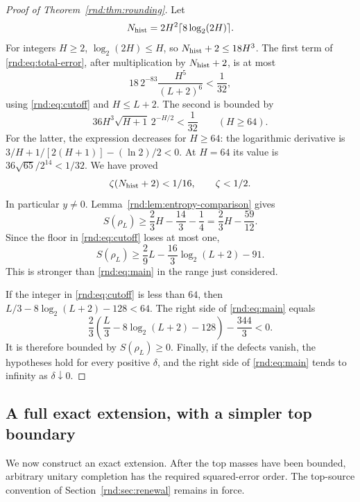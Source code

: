 \begin{proof}[Proof of Theorem~\ref{rnd:thm:rounding}]
Let
\[
 N_{\rm hist}=2H^2\lceil8\log_2(2H)\rceil.
\]
For integers $H\ge2$, $\log_2(2H)\le H$, so
$N_{\rm hist}+2\le18H^3$.
The first term of \eqref{rnd:eq:total-error}, after multiplication by $N_{\rm hist}+2$, is at most
\[
 18\,2^{-83}\frac{H^5}{(L+2)^6}<\frac1{32},
\]
using \eqref{rnd:eq:cutoff} and $H\le L+2$. The second is bounded by
\[
 36H^3\sqrt{H+1}\,2^{-H/2}<\frac1{32}\qquad(H\ge64).
\]
For the latter, the expression decreases for $H\ge64$: the logarithmic derivative is
$3/H+1/[2(H+1)]-(\ln2)/2<0$. At $H=64$ its value is
$36\sqrt{65}/2^{14}<1/32$. We have proved
\[
 \zeta(N_{\rm hist}+2)<1/16,\qquad \zeta<1/2.
\]
In particular $y\ne0$. Lemma~\ref{rnd:lem:entropy-comparison} gives
\[
 S(\rho_L)\ge\frac23H-\frac{14}{3}-\frac14
 =\frac23H-\frac{59}{12}.
\]
Since the floor in \eqref{rnd:eq:cutoff} loses at most one,
\[
 S(\rho_L)\ge\frac29L-\frac{16}{3}\log_2(L+2)-91.
\]
This is stronger than \eqref{rnd:eq:main} in the range just considered.

If the integer in \eqref{rnd:eq:cutoff} is less than $64$, then
$L/3-8\log_2(L+2)-128<64$. The right side of \eqref{rnd:eq:main} equals
\[
 \frac23\left(\frac L3-8\log_2(L+2)-128\right)-\frac{344}{3}<0.
\]
It is therefore bounded by $S(\rho_L)\ge0$. Finally, if the defects vanish, the hypotheses hold for every positive $\delta$, and the right side of \eqref{rnd:eq:main} tends to infinity as $\delta\downarrow0$.
\end{proof}
\subsection{A full exact extension, with a simpler top boundary}\label{rnd:sec:exact-completion}
We now construct an exact extension. After the top masses have been bounded, arbitrary unitary completion has the required squared-error order. The top-source convention of Section~\ref{rnd:sec:renewal} remains in force.

